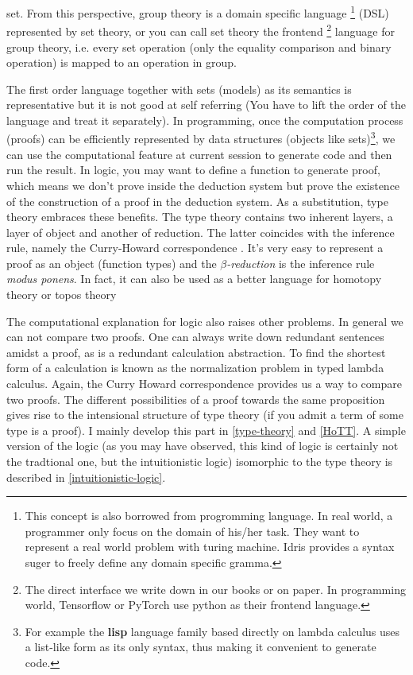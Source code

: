 set. From this perspective, group theory is a domain specific language
\footnote{This concept is also borrowed from progromming language.
In real world, a programmer only focus on the domain of his/her task.
They want to represent a real world problem with turing machine. Idris
provides a syntax suger to freely define any domain specific gramma.} 
(DSL) represented by set theory, or you can call set theory the frontend 
\footnote{The direct interface we write down in our books or on paper. 
In programming world, Tensorflow or PyTorch use python as their frontend 
language.} language for group theory, i.e. every set operation (only the 
equality comparison and binary operation) is mapped to an operation in 
group. 

The first order language together 
with sets (models) as its semantics is representative but it is not good 
at self referring (You have to lift the order of the language and treat 
it separately). In programming, once the computation process (proofs) can 
be efficiently represented by data structures (objects like sets)\footnote{
    For example the {\bf lisp} language family based directly on lambda
    calculus uses a list-like form as its only syntax, thus making it
    convenient to generate code.
}, we can use the computational feature at current session to generate
code and then run the result. In logic, you may want to define a function
to generate proof, which means we don't prove inside the deduction system
but prove the existence of the construction of a proof in the deduction
system. As a substitution, type theory embraces these benefits. 
The type theory contains two inherent layers, a layer of object and
another of reduction. The latter coincides with the inference rule,
namely the Curry-Howard correspondence \cite{Curry-Howard,
intuitionistic-type-theory}. It's very easy to represent a proof as an
object (function types) and the {\it $\beta$-reduction} is the inference
rule {\it modus ponens}. In fact, it can also be used as a better language
for homotopy theory \cite{homotopy-type-theory} or topos theory
\cite{Introduction-to-higher-order-categorical-logic,categorical-logic-and-type-theory}

The computational explanation for logic also raises other problems.
In general we can not compare two proofs. One can always write down
redundant sentences amidst a proof, as is a redundant calculation
abstraction. To find the shortest form of a calculation is known as
the normalization problem in typed lambda calculus\cite{Curry-Howard}.
Again, the Curry Howard correspondence provides us a way to compare two
proofs. The different possibilities of a proof towards the same proposition
gives rise to the intensional structure of type theory (if you admit a
term of some type is a proof). I mainly develop this part in 
\autoref{type-theory} and \autoref{HoTT}. A simple version of the logic
(as you may have observed, this kind of logic is certainly not the
tradtional one, but the intuitionistic logic) isomorphic to the type
theory is described in \autoref{intuitionistic-logic}.

